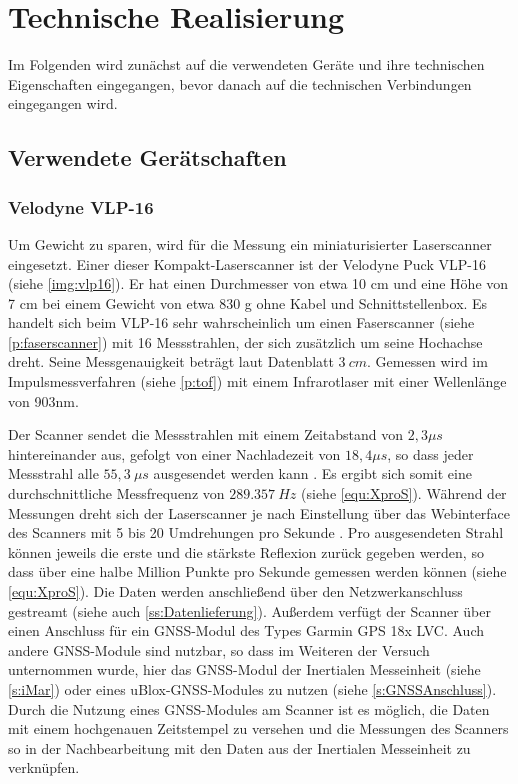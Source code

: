 \documentclass[a4paper,12pt,bibliography=totoc, listof=totoc,titlepage,pointlessnumbers]{scrreprt}
\begin{document}

\chapter{Technische Realisierung}
\label{c:realisierung}


Im Folgenden wird zunächst auf die verwendeten Geräte und ihre technischen Eigenschaften eingegangen, bevor danach auf die technischen Verbindungen eingegangen wird.

\section {Verwendete Gerätschaften}

\subsection{Velodyne VLP-16}
\label{sss:vlp16}
Um Gewicht zu sparen, wird für die Messung ein miniaturisierter Laserscanner eingesetzt. Einer dieser Kompakt-Laserscanner ist der Velodyne Puck VLP-16 (siehe \autoref{img:vlp16}). Er hat einen Durchmesser von etwa 10 cm und eine Höhe von 7 cm bei einem Gewicht von etwa 830 g ohne Kabel und Schnittstellenbox. Es handelt sich beim VLP-16 sehr wahrscheinlich um einen Faserscanner (siehe \autoref{p:faserscanner}) mit 16 Messstrahlen, der sich zusätzlich um seine Hochachse dreht. Seine Messgenauigkeit beträgt laut Datenblatt \(3~cm\). Gemessen wird im Impulsmessverfahren (siehe \autoref{p:tof}) mit einem Infrarotlaser mit einer Wellenlänge von 903nm. \citep{vlpSheet}

Der Scanner sendet die Messstrahlen mit einem Zeitabstand von \(2,3\mu s\) hintereinander aus, gefolgt von einer Nachladezeit von \(18,4\mu s\), so dass jeder Messstrahl alle \(55,3~\mu s\) ausgesendet werden kann \citep[S. 16]{vlpManual}. Es ergibt sich somit eine durchschnittliche Messfrequenz von \(289.357~Hz\) (siehe \autoref{equ:XproS}). Während der Messungen dreht sich der Laserscanner je nach Einstellung über das Webinterface des Scanners mit 5 bis 20 Umdrehungen pro Sekunde \citep{vlpSheet}. Pro ausgesendeten Strahl können jeweils die erste und die stärkste Reflexion zurück gegeben werden, so dass über eine halbe Million Punkte pro Sekunde gemessen werden können (siehe \autoref{equ:XproS}). Die Daten werden anschließend über den Netzwerkanschluss gestreamt (siehe auch \autoref{ss:Datenlieferung}). Außerdem verfügt der Scanner über einen Anschluss für ein GNSS-Modul des Types Garmin GPS 18x LVC. Auch andere GNSS-Module sind nutzbar, so dass im Weiteren der Versuch unternommen wurde, hier das GNSS-Modul der Inertialen Messeinheit (siehe \autoref{s:iMar}) oder eines uBlox-GNSS-Modules zu nutzen (siehe \autoref{s:GNSSAnschluss}). Durch die Nutzung eines GNSS-Modules am Scanner ist es möglich, die Daten mit einem hochgenauen Zeitstempel zu versehen und die Messungen des Scanners so in der Nachbearbeitung mit den Daten aus der Inertialen Messeinheit zu verknüpfen.
\end{document}
